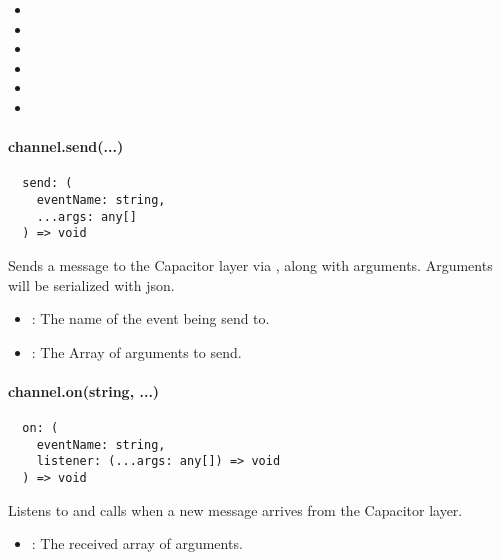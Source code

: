 \begin{itemize}
  \setlength\itemsep{-0.8em}
  \item {}
  \item {}
  \item {}
  \item {}
  \item {}
  \item {}
\end{itemize}


\paragraph{channel.send(...)}

\begin{verbatim}
  send: (
    eventName: string,
    ...args: any[]
  ) => void
\end{verbatim}

Sends a message to the Capacitor layer via , along with arguments.
Arguments will be serialized with \ac{json}.

\begin{itemize}
  \setlength\itemsep{-0.8em}
  \item {}: The name of the event being send to.
  \item {}: The Array of arguments to send.
\end{itemize}


\paragraph{channel.on(string, ...)}

\begin{verbatim}
  on: (
    eventName: string,
    listener: (...args: any[]) => void
  ) => void
\end{verbatim}

Listens to  and calls  when a new message arrives from the Capacitor layer.

\begin{itemize}
  \setlength\itemsep{-0.8em}
  \item {}: The received array of arguments.
\end{itemize}

